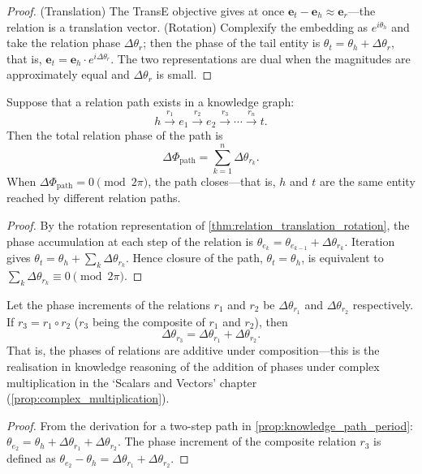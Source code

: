 \begin{proof}
(Translation) The TransE objective gives at once $\mathbf{e}_t-\mathbf{e}_h\approx\mathbf{e}_r$---the relation is a translation vector.
(Rotation) Complexify the embedding as $e^{i\theta_h}$ and take the relation phase $\Delta\theta_r$; then the phase of the tail entity is $\theta_t=\theta_h+\Delta\theta_r$, that is, $\mathbf{e}_t=\mathbf{e}_h\cdot e^{i\Delta\theta_r}$. The two representations are dual when the magnitudes are approximately equal and $\Delta\theta_r$ is small.
\end{proof}

\begin{proposition}\label{prop:knowledge_path_period}
Suppose that a relation path exists in a knowledge graph:
\[
h\xrightarrow{r_1}e_1\xrightarrow{r_2}e_2\xrightarrow{r_3}\cdots\xrightarrow{r_n}t.
\]
Then the total relation phase of the path is
\[
\Delta\Phi_{\text{path}}=\sum_{k=1}^n\Delta\theta_{r_k}.
\]
When $\Delta\Phi_{\text{path}}=0\pmod{2\pi}$, the path closes---that is, $h$ and $t$ are the same entity reached by different relation paths.
\end{proposition}

\begin{proof}
By the rotation representation of \cref{thm:relation_translation_rotation}, the phase accumulation at each step of the relation is $\theta_{e_{k}}=\theta_{e_{k-1}}+\Delta\theta_{r_k}$. Iteration gives $\theta_t=\theta_h+\sum_k\Delta\theta_{r_k}$. Hence closure of the path, $\theta_t=\theta_h$, is equivalent to $\sum_k\Delta\theta_{r_k}\equiv0\pmod{2\pi}$.
\end{proof}

\begin{lemma}\label{lem:transitive_relation_phase}
Let the phase increments of the relations $r_1$ and $r_2$ be $\Delta\theta_{r_1}$ and $\Delta\theta_{r_2}$ respectively. If $r_3=r_1\circ r_2$ ($r_3$ being the composite of $r_1$ and $r_2$), then
\[
\Delta\theta_{r_3}=\Delta\theta_{r_1}+\Delta\theta_{r_2}.
\]
That is, the phases of relations are additive under composition---this is the realisation in knowledge reasoning of the addition of phases under complex multiplication in the `Scalars and Vectors' chapter (\cref{prop:complex_multiplication}).
\end{lemma}

\begin{proof}
From the derivation for a two-step path in \cref{prop:knowledge_path_period}: $\theta_{e_2}=\theta_h+\Delta\theta_{r_1}+\Delta\theta_{r_2}$. The phase increment of the composite relation $r_3$ is defined as $\theta_{e_2}-\theta_h=\Delta\theta_{r_1}+\Delta\theta_{r_2}$.
\end{proof}

